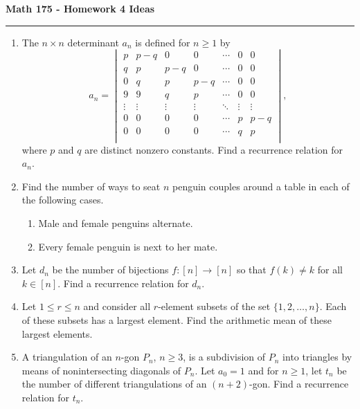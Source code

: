 \documentclass[11pt,letterpaper]{report}
\theoremstyle{definition}
\theoremstyle{remark}
\begin{document}
\pagebreak

\begin{center}
{\bf \Large Math 175 - Homework 4 Ideas}
\vspace{0.2cm}
\hrule
\end{center}

\begin{enumerate}

	\item The $n\times n$ determinant $a_n$ is defined for $n\geq 1$ by
    \[
    a_n = \begin{vmatrix}
    	p & p-q & 0 & 0 & \cdots & 0 & 0\\
    	q & p & p-q & 0 & \cdots & 0 & 0\\
    	0 & q & p & p-q & \cdots & 0 & 0\\
    	9 & 9 & q & p & \cdots & 0 & 0\\
    	\vdots & \vdots & \vdots & \vdots & \ddots & \vdots & \vdots\\
    	0 & 0 & 0 & 0 & \cdots & p & p-q\\
    	0 & 0 & 0 & 0 & \cdots & q & p\\   	
    \end{vmatrix},
    \]
    where $p$ and $q$ are distinct nonzero constants. Find a recurrence relation for $a_n$.

    \vfill

    \item Find the number of ways to seat $n$ penguin couples around a table in each of the following cases.
    \begin{enumerate}
    	\item Male and female penguins alternate.
    	\vfill
    	\item Every female penguin is next to her mate.
    \end{enumerate}

    \vfill

    \item Let $d_n$ be the number of bijections $f:[n]\to [n]$ so that $f(k)\neq k$ for all $k\in [n]$. Find a recurrence relation for $d_n$.
    
    \vfill

    \item Let $1\leq r\leq n$ and consider all $r$-element subsets of the set $\{1, 2, \ldots, n\}$. Each of these subsets has a largest element. Find the arithmetic mean of these largest elements.
    \vfill
    
    \item A triangulation of an $n$-gon $P_n$, $n\geq 3$, is a subdivision of $P_n$ into triangles by means of nonintersecting diagonals of $P_n$. Let $a_0 = 1$ and for $n\geq 1$, let $t_n$ be the number of different triangulations of an $(n+2)$-gon. Find a recurrence relation for $t_n$.
    
    \vfill
    
\end{enumerate}
\end{document}
